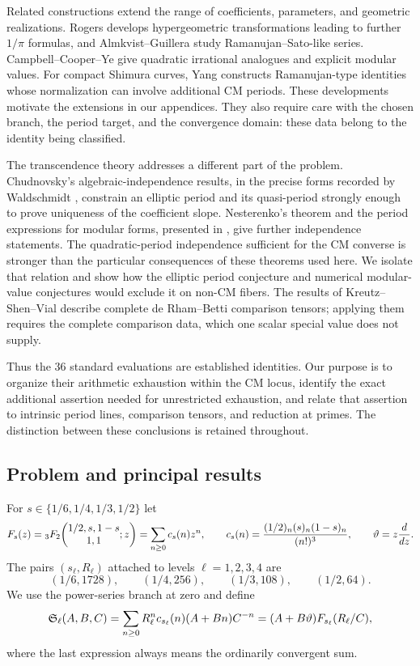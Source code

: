 Related constructions extend the range of coefficients, parameters,
and geometric realizations. Rogers \cite{RogersDomb} develops
hypergeometric transformations leading to further $1/\pi$ formulas,
and Almkvist--Guillera \cite{AG} study Ramanujan--Sato-like series.
Campbell--Cooper--Ye \cite{CCY} give quadratic irrational analogues and
explicit modular values. For compact Shimura curves, Yang \cite{Yang}
constructs Ramanujan-type identities whose normalization can involve
additional CM periods. These developments motivate the extensions in
our appendices. They also require care with the chosen branch, the
period target, and the convergence domain: these data belong to the
identity being classified.

The transcendence theory addresses a different part of the problem.
Chudnovsky's algebraic-independence results, in the precise forms
recorded by Waldschmidt \cite{Waldschmidt,WaldschmidtSurvey}, constrain
an elliptic period and its quasi-period strongly enough to prove
uniqueness of the coefficient slope. Nesterenko's theorem and the
period expressions for modular forms, presented in \cite{Fonseca},
give further independence statements. The quadratic-period independence
sufficient for the CM converse is stronger than the particular consequences of
these theorems used here. We isolate that relation and show how the
elliptic period conjecture and numerical modular-value conjectures
\cite{Fonseca,EterovicMSCD} would exclude it on non-CM fibers.
The results of Kreutz--Shen--Vial \cite{KSV} describe complete
de Rham--Betti comparison tensors; applying them requires the complete
comparison data, which one scalar special value does not supply.

Thus the $36$ standard evaluations are established identities. Our
purpose is to organize their arithmetic exhaustion within the CM
locus, identify the exact additional assertion needed for unrestricted
exhaustion, and relate that assertion to intrinsic period lines,
comparison tensors, and reduction at primes. The distinction between
these conclusions is retained throughout.

\subsection{Problem and principal results}

For $s\in\{1/6,1/4,1/3,1/2\}$ let
\[
 F_s(z)={}_3F_2\!\left(\begin{matrix}1/2,s,1-s\\1,1\end{matrix};z\right)
       =\sum_{n\ge0}c_s(n)z^n,
 \qquad c_s(n)=\frac{(1/2)_n(s)_n(1-s)_n}{(n!)^3},
 \qquad\vartheta=z\frac d{dz}.
\]
The pairs $(s_\ell,R_\ell)$ attached to levels $\ell=1,2,3,4$ are
\[
 (1/6,1728),\qquad(1/4,256),\qquad(1/3,108),\qquad(1/2,64).
\]
We use the power-series branch at zero and define
\begin{equation}\label{eq:series}
 \mathfrak S_\ell(A,B,C)
  =\sum_{n\ge0}R_\ell^nc_{s_\ell}(n)(A+Bn)C^{-n}
  =(A+B\vartheta)F_{s_\ell}(R_\ell/C),
\end{equation}
where the last expression always means the ordinarily convergent sum.

